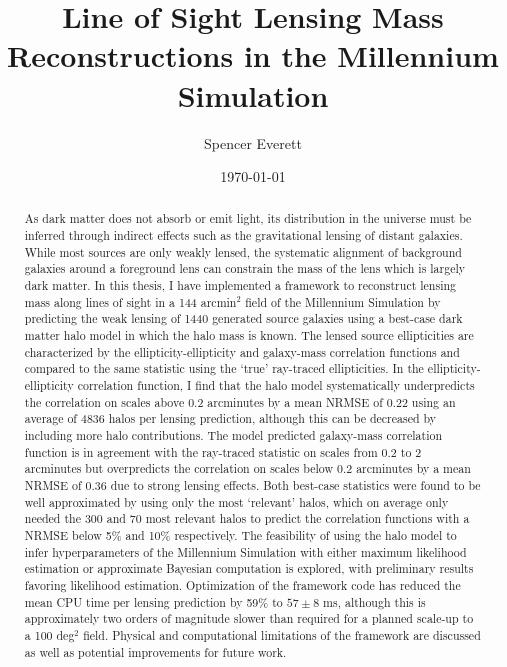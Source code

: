 \documentclass[%
 reprint,
 amsmath,amssymb,
 aps,nofootinbib
]{revtex4-1}
\begin{document}
\title{Line of Sight Lensing Mass Reconstructions in the Millennium Simulation}

\author{Spencer Everett}


\date{\today}

\begin{abstract}
\noindent As dark matter does not absorb or emit light, its distribution in the universe must be inferred through indirect effects such as the gravitational lensing of distant galaxies. While most sources are only weakly lensed, the systematic alignment of background galaxies around a foreground lens can constrain the mass of the lens which is largely dark matter. In this thesis, I have implemented a framework to reconstruct lensing mass along lines of sight in a 144 arcmin$^2$ field of the Millennium Simulation by predicting the weak lensing of 1440 generated source galaxies using a best-case dark matter halo model in which the halo mass is known. The lensed source ellipticities are characterized by the ellipticity-ellipticity and galaxy-mass correlation functions and compared to the same statistic using the `true' ray-traced ellipticities. In the ellipticity-ellipticity correlation function, I find that the halo model systematically underpredicts the correlation on scales above 0.2 arcminutes by a mean NRMSE of 0.22 using an average of 4836 halos per lensing prediction, although this can be decreased by including more halo contributions. The model predicted galaxy-mass correlation function is in agreement with the ray-traced statistic on scales from 0.2 to 2 arcminutes but overpredicts the correlation on scales below 0.2 arcminutes by a mean NRMSE of 0.36 due to strong lensing effects. Both best-case statistics were found to be well approximated by using only the most `relevant' halos, which on average only needed the 300 and 70 most relevant halos to predict the correlation functions with a NRMSE below 5\% and 10\% respectively. The feasibility of using the halo model to infer hyperparameters of the Millennium Simulation with either maximum likelihood estimation or approximate Bayesian computation is explored, with preliminary results favoring likelihood estimation. Optimization of the framework code has reduced the mean CPU time per lensing prediction by 59\% to $57\pm8$ ms, although this is approximately two orders of magnitude slower than required for a planned scale-up to a 100 deg$^2$ field. Physical and computational limitations of the framework are discussed as well as potential improvements for future work.
\end{abstract}
\end{document}
